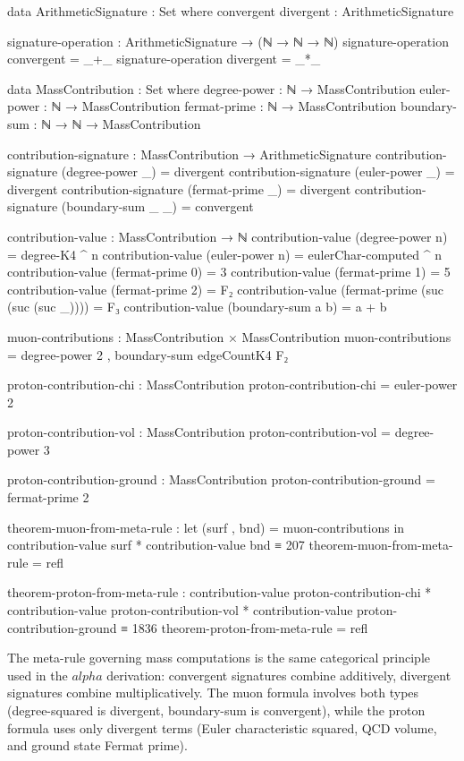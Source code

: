 \documentclass[11pt,a4paper]{book}
\def\alpha{alpha}%
\begin{document}
\begin{code}
data ArithmeticSignature : Set where
  convergent divergent : ArithmeticSignature

signature-operation : ArithmeticSignature → (ℕ → ℕ → ℕ)
signature-operation convergent = _+_
signature-operation divergent = _*_

data MassContribution : Set where
  degree-power : ℕ → MassContribution
  euler-power  : ℕ → MassContribution
  fermat-prime : ℕ → MassContribution
  boundary-sum : ℕ → ℕ → MassContribution

contribution-signature : MassContribution → ArithmeticSignature
contribution-signature (degree-power _) = divergent
contribution-signature (euler-power _)  = divergent
contribution-signature (fermat-prime _) = divergent
contribution-signature (boundary-sum _ _) = convergent

contribution-value : MassContribution → ℕ
contribution-value (degree-power n) = degree-K4 ^ n
contribution-value (euler-power n)  = eulerChar-computed ^ n
contribution-value (fermat-prime 0) = 3
contribution-value (fermat-prime 1) = 5
contribution-value (fermat-prime 2) = F₂
contribution-value (fermat-prime (suc (suc (suc _)))) = F₃
contribution-value (boundary-sum a b) = a + b

muon-contributions : MassContribution × MassContribution
muon-contributions = degree-power 2 , boundary-sum edgeCountK4 F₂

proton-contribution-chi : MassContribution
proton-contribution-chi = euler-power 2

proton-contribution-vol : MassContribution
proton-contribution-vol = degree-power 3

proton-contribution-ground : MassContribution
proton-contribution-ground = fermat-prime 2

theorem-muon-from-meta-rule : 
  let (surf , bnd) = muon-contributions
  in contribution-value surf * contribution-value bnd ≡ 207
theorem-muon-from-meta-rule = refl

theorem-proton-from-meta-rule :
  contribution-value proton-contribution-chi * 
  contribution-value proton-contribution-vol * 
  contribution-value proton-contribution-ground ≡ 1836
theorem-proton-from-meta-rule = refl
\end{code}

The meta-rule governing mass computations is the same categorical principle used in the $\alpha$ derivation: convergent signatures combine additively, divergent signatures combine multiplicatively. The muon formula involves both types (degree-squared is divergent, boundary-sum is convergent), while the proton formula uses only divergent terms (Euler characteristic squared, QCD volume, and ground state Fermat prime).
\end{document}
